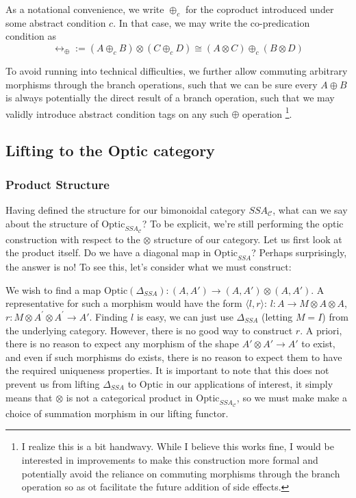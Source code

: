 \documentclass[letterpaper, 10 pt, conference]{ieeeconf}  %
\begin{document}
As a notational convenience, we write $\oplus_c$ for the coproduct introduced
under some abstract condition $c$. In that case, we may write the co-predication
condition as
\[ \leftrightarrow_{\oplus} := (A \oplus_c B) \otimes (C \oplus_c D) \cong (A \otimes C) \oplus_c (B \otimes D) \]

To avoid running into technical difficulties, we further allow commuting arbitrary
morphisms through the branch operations, such that we can be sure every $A \oplus B$
is always potentially the direct result of a branch operation, such that we may
validly introduce abstract condition tags on any such $\oplus$ operation
\footnote{I realize this is a bit handwavy. While I believe this works fine, I would
be interested in improvements to make this construction more formal and
potentially avoid the reliance on commuting morphisms through the branch operation
so as ot facilitate the future addition of side effects.}.

\subsection{Lifting to the Optic category}

\subsubsection{Product Structure}

Having defined the structure for our bimonoidal category $SSA_{\mathcal{C}}$,
what can we say about the structure of $\text{Optic}_{SSA_{\mathcal{C}}}$?
To be explicit, we're still performing the optic construction with respect to
the $\otimes$ structure of our category. Let us first look at the product itself.
Do we have a diagonal map in $\text{Optic}_{SSA}$? Perhaps surprisingly, the answer
is no! To see this, let's consider what we must construct:

We wish to find a map $\text{Optic}(\Delta_{SSA}): (A, A') \to (A, A') \otimes (A, A')$.
A representative for such a morphism would have the form $\langle l, r \rangle$:
$l: A \to M \otimes A \otimes A$, $r: M \otimes A^\prime \otimes A^\prime \to A'$.
Finding $l$ is easy, we can just use $\Delta_{SSA}$ (letting $M=I$) from the underlying category.
However, there is no good way to construct $r$. A priori, there is no reason
to expect any morphism of the shape $A' \otimes A' \to A'$ to exist, and even
if such morphisms do exists, there is no reason to expect them to have the
required uniqueness properties. It is important to note that this does not
prevent us from lifting $\Delta_{SSA}$ to $\text{Optic}$ in our applications
of interest, it simply means that $\otimes$ is not a categorical product in
$\text{Optic}_{SSA_{\mathcal{C}}}$, so we must make make a choice of summation
morphism in our lifting functor.
\end{document}
